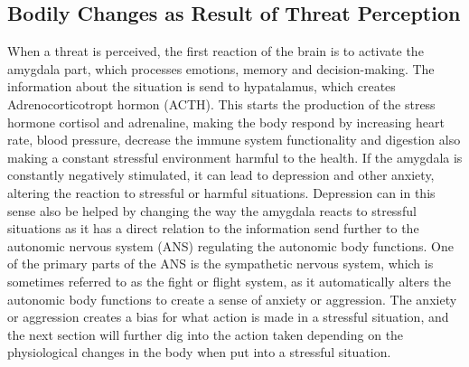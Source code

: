 \subsection{Bodily Changes as Result of Threat Perception}
When a threat is perceived, the first reaction of the brain is to activate the amygdala part, which processes emotions, memory and decision-making. The information about the situation is send to hypatalamus, which creates Adrenocorticotropt hormon (ACTH). This starts the production of the stress hormone cortisol and adrenaline, making the body respond by increasing heart rate, blood pressure, decrease the immune system functionality and digestion also making a constant stressful environment harmful to the health. If the amygdala is constantly negatively stimulated, it can lead to depression and other anxiety, altering the reaction to stressful or harmful situations. Depression can in this sense also be helped by changing the way the amygdala reacts to stressful situations as it has a direct relation to the information send further to the autonomic nervous system (ANS) regulating the autonomic body functions. One of the primary parts of the ANS is the sympathetic nervous system, which is sometimes referred to as the fight or flight system, as it automatically alters the autonomic body functions to create a sense of anxiety or aggression. The anxiety or aggression creates a bias for what action is made in a stressful situation, and the next section will further dig into the action taken depending on the physiological changes in the body when put into a stressful situation.\cite{human_physiology} \cite{perspective_anxiety} \cite{CNS}
